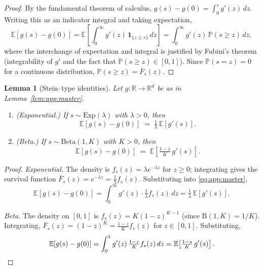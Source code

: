 \documentclass{article}
\theoremstyle{plain}
\newtheorem{lemma}[theorem]{Lemma}
\theoremstyle{definition}
\theoremstyle{remark}
\begin{document}
\begin{proof}
By the fundamental theorem of calculus,
$g(s) - g(0) = \int_0^s g'(z)\, dz$. Writing this as an indicator
integral and taking expectation,
\begin{equation*}
  \mathbb{E}[g(s) - g(0)]
  = \mathbb{E}\!\left[\int_0^\infty g'(z)\, \mathbf{1}_{\{z \leq s\}}\, dz\right]
  = \int_0^\infty g'(z)\, \mathbb{P}(s \geq z)\, dz,
\end{equation*}
where the interchange of expectation and integral is justified by
Fubini's theorem (integrability of $g'$ and the fact that
$\mathbb{P}(s \geq z) \in [0,1]$). Since $\mathbb{P}(s = z) = 0$ for a
continuous distribution, $\mathbb{P}(s \geq z) = \bar F_s(z)$. 
\end{proof}

\begin{lemma}[Stein--type identities]
\label{lem:app:stein}
Let $g : \mathbb{R} \to \mathbb{R}^d$ be as in
Lemma~\ref{lem:app:master}.
\begin{enumerate}[topsep=2pt,itemsep=0pt]
  \item \emph{(Exponential.)} If $s \sim \mathrm{Exp}(\lambda)$ with
  $\lambda > 0$, then
  \begin{equation}
    \mathbb{E}[g(s) - g(0)]
    \;=\; \tfrac{1}{\lambda}\, \mathbb{E}[g'(s)].
    \label{eq:app:stein-exp}
  \end{equation}
  \item \emph{(Beta.)} If $s \sim \mathrm{Beta}(1, K)$ with $K > 0$,
  then
  \begin{equation}
    \mathbb{E}[g(s) - g(0)]
    \;=\; \mathbb{E}\!\left[\tfrac{1 - s}{K}\, g'(s)\right].
    \label{eq:app:stein-beta}
  \end{equation}
\end{enumerate}
\end{lemma}

\begin{proof}
\emph{Exponential.} The density is $f_s(z) = \lambda e^{-\lambda z}$ for
$z \geq 0$; integrating gives the survival function $\bar F_s(z) =
e^{-\lambda z} = \tfrac{1}{\lambda} f_s(z)$. Substituting into
\eqref{eq:app:master},
\[
  \mathbb{E}[g(s) - g(0)]
  = \int_0^\infty g'(z) \cdot \tfrac{1}{\lambda} f_s(z)\, dz
  = \tfrac{1}{\lambda}\, \mathbb{E}[g'(s)].
\]

\emph{Beta.} The density on $[0,1]$ is $f_s(z) = K(1-z)^{K-1}$ (since
$\mathrm{B}(1,K) = 1/K$). Integrating, $\bar F_s(z) = (1-z)^K =
\tfrac{1-z}{K} f_s(z)$ for $z \in [0,1]$. Substituting,
\[
  \mathbb{E}[g(s) - g(0)]
  = \int_0^1 g'(z)\, \tfrac{1-z}{K} f_s(z)\, dz
  = \mathbb{E}\!\left[\tfrac{1-s}{K}\, g'(s)\right]. \qedhere
\]
\end{proof}
\end{document}
